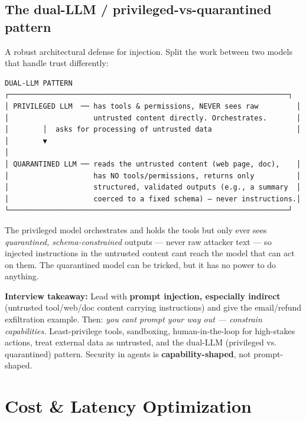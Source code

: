 \documentclass[11pt]{article}
\begin{document}
\subsection{The dual-LLM / privileged-vs-quarantined pattern}\label{the-dual-llm--privileged-vs-quarantined-pattern}

A robust architectural defense for injection. Split the work between two models that handle trust differently:

\setcodelang{}

\begin{verbatim}
DUAL-LLM PATTERN
┌──────────────────────────────────────────────────────────────────┐
│ PRIVILEGED LLM  ── has tools & permissions, NEVER sees raw         │
│                    untrusted content directly. Orchestrates.       │
│        │  asks for processing of untrusted data                    │
│        ▼                                                            │
│ QUARANTINED LLM ── reads the untrusted content (web page, doc),    │
│                    has NO tools/permissions, returns only          │
│                    structured, validated outputs (e.g., a summary  │
│                    coerced to a fixed schema) — never instructions.│
└──────────────────────────────────────────────────────────────────┘
\end{verbatim}

The privileged model orchestrates and holds the tools but only ever sees \emph{quarantined, schema-constrained} outputs --- never raw attacker text --- so injected instructions in the untrusted content can\textquotesingle t reach the model that can act on them. The quarantined model can be tricked, but it has no power to do anything.

\textbf{Interview takeaway:} Lead with \textbf{prompt injection, especially indirect} (untrusted tool/web/doc content carrying instructions) and give the email/refund exfiltration example. Then: \emph{you can\textquotesingle t prompt your way out --- constrain capabilities.} Least-privilege tools, sandboxing, human-in-the-loop for high-stakes actions, treat external data as untrusted, and the dual-LLM (privileged vs. quarantined) pattern. Security in agents is \textbf{capability-shaped}, not prompt-shaped.

\section{Cost \& Latency Optimization}\label{cost--latency-optimization}
\end{document}
